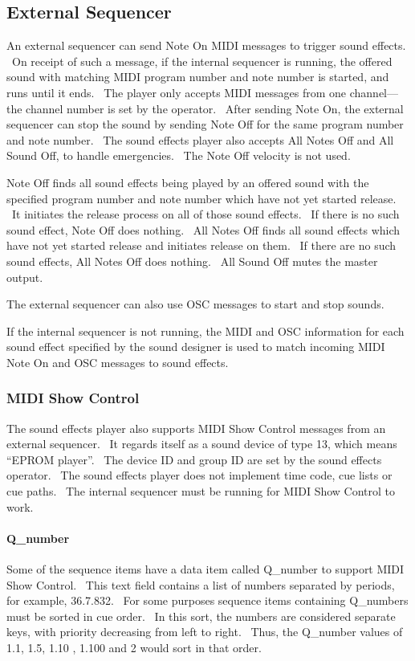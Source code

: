 \documentclass[letterpaper]{article}
\begin{document}
\subsection{External Sequencer}
An external sequencer can send Note On MIDI messages to trigger sound
effects. \ On receipt of such a message, if the internal sequencer is
running, the offered sound with matching MIDI program number and note
number is started, and runs until it ends. \ The player only accepts
MIDI messages from one channel—the channel number is set by the
operator. \ After sending Note On, the external sequencer can stop the
sound by sending Note Off for the same program number and note number.
\ The sound effects player also accepts All Notes Off and All Sound
Off, to handle emergencies. \ The Note Off velocity is not used.

Note Off finds all sound effects being played by an offered sound with
the specified program number and note number which have not yet started
release. \ It initiates the release process on all of those sound
effects. \ If there is no such sound effect, Note Off does nothing.
\ All Notes Off finds all sound effects which have not yet started
release and initiates release on them. \ If there are no such sound
effects, All Notes Off does nothing. \ All Sound Off mutes the master
output.

The external sequencer can also use OSC messages to start and stop
sounds.

If the internal sequencer is not running, the MIDI and OSC information
for each sound effect specified by the sound designer is used to match
incoming MIDI Note On and OSC messages to sound effects.

\subsubsection{MIDI Show Control}
The sound effects player also supports MIDI Show Control messages from
an external sequencer. \ It regards itself as a sound device of type
13, which means “EPROM player”. \ The device ID and group ID are set by
the sound effects operator. \ The sound effects player does not
implement time code, cue lists or cue paths. \ The internal sequencer
must be running for MIDI Show Control to work.

\paragraph{Q\_number}
Some of the sequence items have a data item called Q\_number to support
MIDI Show Control. \ This text field contains a list of numbers
separated by periods, for example, 36.7.832. \ For some purposes
sequence items containing Q\_numbers must be sorted in cue order. \ In
this sort, the numbers are considered separate keys, with priority
decreasing from left to right. \ Thus, the Q\_number values of 1.1,
1.5, 1.10 , 1.100 and 2 would sort in that order.
\end{document}
